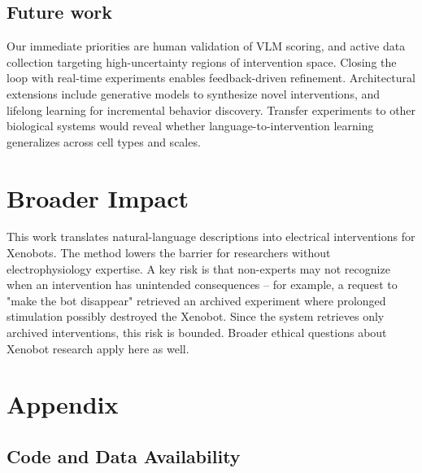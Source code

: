\documentclass{article}
\begin{document}
\subsection{Future work}
\label{sec:futurework}

Our immediate priorities are human validation of VLM scoring, and active data collection targeting high-uncertainty regions of intervention space. Closing the loop with real-time experiments enables feedback-driven refinement. Architectural extensions include generative models to synthesize novel interventions, and lifelong learning for incremental behavior discovery. Transfer experiments to other biological systems would reveal whether language-to-intervention learning generalizes across cell types and scales.

\section*{Broader Impact}
\label{sec:broaderImpact}

This work translates natural-language descriptions into electrical 
interventions for Xenobots. The method lowers the barrier for researchers 
without electrophysiology expertise. A key risk is that non-experts may not 
recognize when an intervention has unintended consequences -- for example, a request to "make the bot disappear" retrieved an archived experiment where prolonged stimulation possibly destroyed the Xenobot. Since the system retrieves only archived interventions, this risk is bounded. Broader ethical questions about Xenobot research apply here as well.



\newpage
\appendix

\section*{Appendix}

\subsection*{Code and Data Availability}
\end{document}
